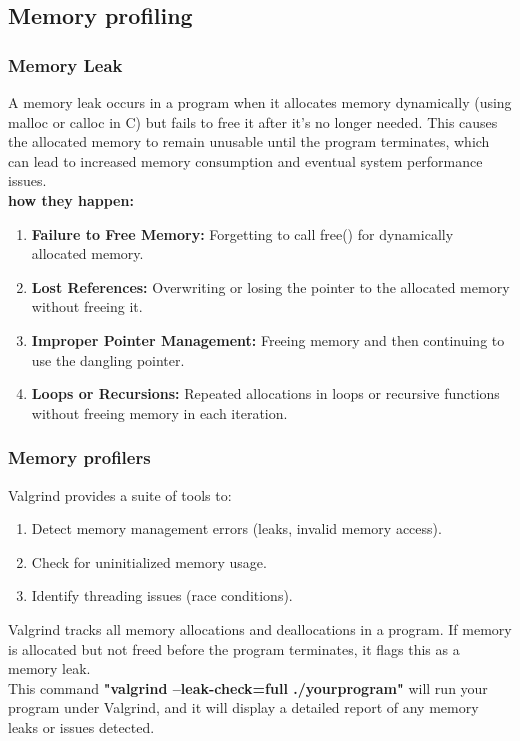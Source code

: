 \documentclass{article}
\begin{document}
    \subsection{Memory profiling}
        \subsubsection{Memory Leak}
        A memory leak occurs in a program when it allocates memory dynamically (using malloc or calloc in C) but fails to free it after it's no longer needed. This causes the allocated memory to remain unusable until the program terminates, which can lead to increased memory consumption and eventual system performance issues.
        \\\textbf{how they happen:}
        \begin{enumerate}
            \item \textbf{Failure to Free Memory:} Forgetting to call free() for dynamically allocated memory.
            \item \textbf{Lost References:} Overwriting or losing the pointer to the allocated memory without freeing it.
            \item \textbf{Improper Pointer Management:} Freeing memory and then continuing to use the dangling pointer.
            \item \textbf{Loops or Recursions:} Repeated allocations in loops or recursive functions without freeing memory in each iteration.
        \end{enumerate}
        \subsubsection{Memory profilers}
        Valgrind provides a suite of tools to:
        \begin{enumerate}
            \item Detect memory management errors (leaks, invalid memory access).
            \item Check for uninitialized memory usage.
            \item Identify threading issues (race conditions).
        \end{enumerate}
        Valgrind tracks all memory allocations and deallocations in a program. If memory is allocated but not freed before the program terminates, it flags this as a memory leak.
        \\This command \textbf{"valgrind --leak-check=full ./yourprogram"} will run your program under Valgrind, and it will display a detailed report of any memory leaks or issues detected.
\end{document}
